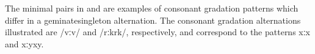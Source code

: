 The minimal pairs in  and  are examples of consonant gradation patterns which differ in a geminate\Div singleton alternation. The consonant gradation alternations illustrated are \mbox{/vː\Div v/} and \mbox{/rːk\Div rk/}, respectively, and correspond to the patterns \mbox{xː\Div x} and \mbox{xːy\Div xy}. %
\ea\label{CgradEx1a}%
\z
\ea\label{CgradEx1b}%
\z

